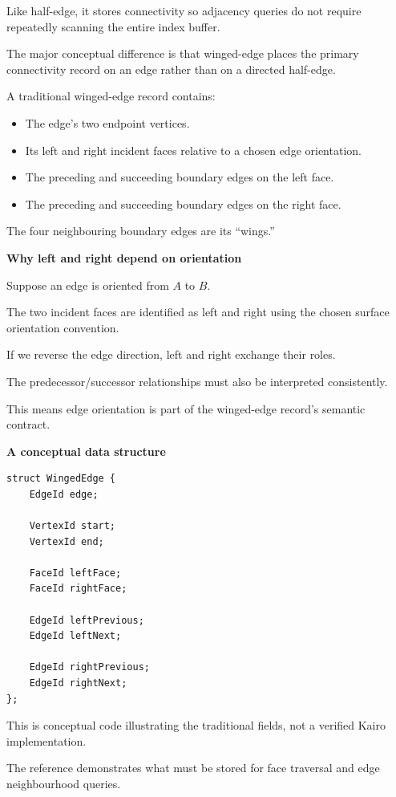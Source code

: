 Like half-edge, it stores connectivity so adjacency queries do not require repeatedly scanning the entire index buffer.

The major conceptual difference is that winged-edge places the primary connectivity record on an edge rather than on a directed half-edge.

A traditional winged-edge record contains:

\begin{itemize}
\tightlist
\item
  The edge's two endpoint vertices.
\item
  Its left and right incident faces relative to a chosen edge orientation.
\item
  The preceding and succeeding boundary edges on the left face.
\item
  The preceding and succeeding boundary edges on the right face.
\end{itemize}

The four neighbouring boundary edges are its ``wings.''

\textbf{Why left and right depend on orientation}

Suppose an edge is oriented from \(A\) to \(B\).

The two incident faces are identified as left and right using the chosen surface orientation convention.

If we reverse the edge direction, left and right exchange their roles.

The predecessor/successor relationships must also be interpreted consistently.

This means edge orientation is part of the winged-edge record's semantic contract.

\textbf{A conceptual data structure}

\begin{verbatim}
struct WingedEdge {
    EdgeId edge;

    VertexId start;
    VertexId end;

    FaceId leftFace;
    FaceId rightFace;

    EdgeId leftPrevious;
    EdgeId leftNext;

    EdgeId rightPrevious;
    EdgeId rightNext;
};
\end{verbatim}

This is conceptual code illustrating the traditional fields, not a verified Kairo implementation.

The reference demonstrates what must be stored for face traversal and edge neighbourhood queries.

